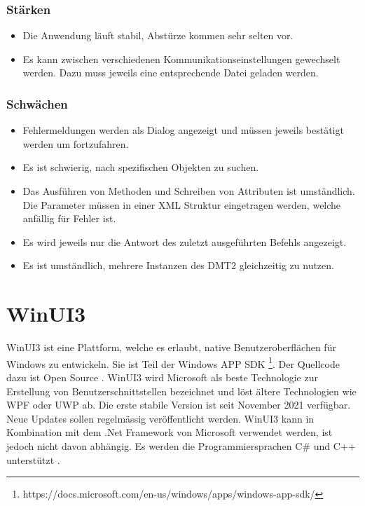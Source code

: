 \subsubsection{Stärken}
\begin{itemize}
   \item Die Anwendung läuft stabil, Abstürze kommen sehr selten vor.
   \item Es kann zwischen verschiedenen Kommunikationseinstellungen gewechselt werden. Dazu muss jeweils eine entsprechende Datei geladen werden.
\end{itemize}

\subsubsection{Schwächen}
\begin{itemize}
   \item Fehlermeldungen werden als Dialog angezeigt und müssen jeweils bestätigt werden um fortzufahren.
   \item Es ist schwierig, nach spezifischen Objekten zu suchen.
   \item Das Ausführen von Methoden und Schreiben von Attributen ist umständlich. Die Parameter müssen in einer XML Struktur eingetragen werden, welche anfällig für Fehler ist.
   \item Es wird jeweils nur die Antwort des zuletzt ausgeführten Befehls angezeigt.
   \item Es ist umständlich, mehrere Instanzen des \ac{DMT2} gleichzeitig zu nutzen. 
\end{itemize}


\section{WinUI3}
WinUI3 ist eine Plattform, welche es erlaubt, native Benutzeroberflächen für Windows zu entwickeln.
Sie ist Teil der Windows APP SDK \footnote{https://docs.microsoft.com/en-us/windows/apps/windows-app-sdk/}.
Der Quellcode dazu ist Open Source \parencite{winuiintro}.
WinUI3 wird Microsoft als beste Technologie zur Erstellung von Benutzerschnittstellen bezeichnet und löst ältere Technologien wie \ac{WPF} oder \ac{UWP} ab.
Die erste stabile Version ist seit November 2021 verfügbar.
Neue Updates sollen regelmässig veröffentlicht werden.
WinUI3 kann in Kombination mit dem .Net Framework von Microsoft verwendet werden, ist jedoch nicht davon abhängig.
Es werden die Programmiersprachen C\# und C++ unterstützt \parencite{winuiroadmap}.


\pagebreak

\pagebreak



